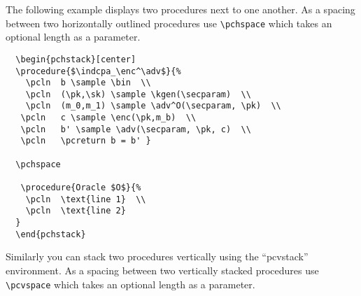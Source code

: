 \documentclass[a4paper]{report}
\begin{document}
  The following example displays two procedures next to one another. As a spacing between two horizontally outlined procedures
  use \lstinline{\pchspace} which takes an optional length as a parameter.
  
  \begin{pchstack}[center]
  
  \pchspace
  
  \end{pchstack}
  
  \begin{lstlisting}
  \begin{pchstack}[center]
  \procedure{$\indcpa_\enc^\adv$}{%
	\pcln  b \sample \bin  \\
	\pcln  (\pk,\sk) \sample \kgen(\secparam)  \\
	\pcln  (m_0,m_1) \sample \adv^O(\secparam, \pk)  \\
   \pcln   c \sample \enc(\pk,m_b)  \\
   \pcln   b' \sample \adv(\secparam, \pk, c)  \\
   \pcln   \pcreturn b = b' }
  
  \pchspace
  
   \procedure{Oracle $O$}{%
	\pcln  \text{line 1}  \\
	\pcln  \text{line 2}  
  }
  \end{pchstack}
  \end{lstlisting}
  
  
  Similarly you can stack two procedures vertically using the \enquote{pcvstack} environment. As a spacing between two vertically stacked procedures
  use \lstinline{\pcvspace} which takes an optional length as a parameter.
  
  
  \begin{pcvstack}[center]
  
  \pcvspace
  
  \end{pcvstack}
  
\end{document}
